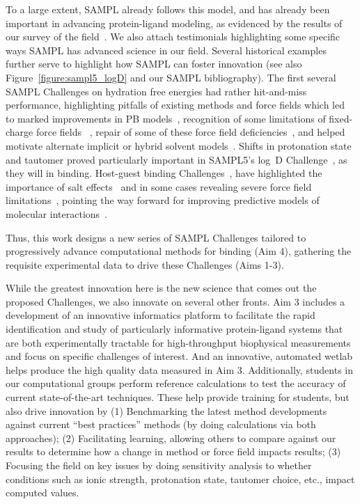 \documentclass[11pt]{article}
\begin{document}
To a large extent, SAMPL already follows this model, and has already been important in advancing protein-ligand modeling, as evidenced by the results of our survey of the field~\cite{Mobley:2017:eScholarship}.
We also attach testimonials highlighting some specific ways SAMPL has advanced science in our field.
Several historical examples further serve to highlight how SAMPL can foster innovation (see also Figure~\ref{figure:sampl5_logD} and our SAMPL bibliography). 
The first several SAMPL Challenges on hydration free energies had rather hit-and-miss performance, highlighting pitfalls of existing methods and force fields which led to marked improvements in PB models~\cite{nicholls_samp1_2009, ellingson_analysis_2010,ellingson_efficient_2014}, recognition of some limitations of fixed-charge force fields ~\cite{mobley_alchemical_2012, Fennell:2014:J.Phys.Chem.B},
repair of some of these force field deficiencies~\cite{mobley_alchemical_2012, Fennell:2014:J.Phys.Chem.B, paranahewage_predicting_2016},
and helped motivate alternate implicit or hybrid solvent models~\cite{sulea_predicting_2011, li_testing_2014, brini_adapting_2016}.
Shifts in protonation state and tautomer proved particularly important in SAMPL5's log~D Challenge~\cite{Bannan:2016:JComputAidedMolDes, klamt_prediction_2016}, as they will in binding.
Host-guest binding Challenges~\cite{Mobley:2017:AnnualReviewofBiophysics},
have highlighted the importance of salt effects~\cite{yin_overview_2016, muddana_blind_2014, Mobley:2017:AnnualReviewofBiophysics}
and in some cases revealing severe force field limitations~\cite{yin_sampl5_2016, muddana_sampl4_2014-1}, pointing the way forward for improving predictive models of molecular interactions~\cite{yin_toward_2015, Mobley:2017:AnnualReviewofBiophysics}.

Thus, this work designs a new series of SAMPL Challenges tailored to progressively advance computational methods for binding (Aim 4), gathering the requisite experimental data to drive these Challenges (Aims 1-3). 

While the greatest innovation here is the new science that comes out the proposed Challenges, we also innovate on several other fronts.
Aim 3 includes a development of an innovative informatics platform to facilitate the rapid identification and study of particularly informative protein-ligand systems that are both experimentally tractable for high-throughput biophysical measurements and focus on specific challenges of interest.
And an innovative, automated wetlab helps produce the high quality data measured in Aim 3. 
Additionally, students in our computational groups perform reference calculations to test the accuracy of current state-of-the-art techniques.
These help provide training for students, but also drive innovation by (1) Benchmarking the latest method developments against current ``best practices'' methods (by doing calculations via both approaches); (2) Facilitating learning, allowing others to compare against our results to determine how a change in method or force field impacts results; (3) Focusing the field on key issues by doing sensitivity analysis to whether conditions such as ionic strength, protonation state, tautomer choice, etc., impact computed values.
\end{document}
